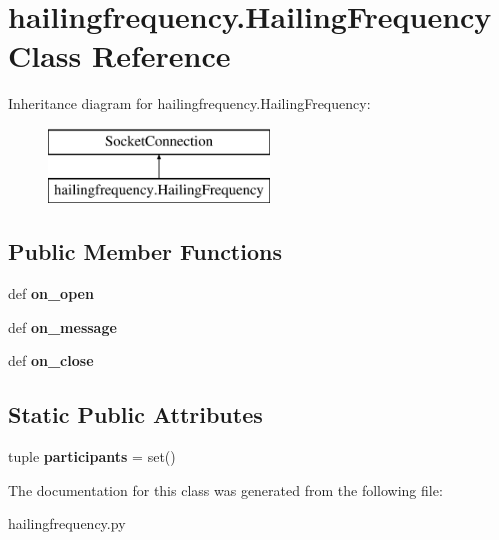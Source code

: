\hypertarget{classhailingfrequency_1_1_hailing_frequency}{\section{hailingfrequency.\-Hailing\-Frequency Class Reference}
\label{classhailingfrequency_1_1_hailing_frequency}
}
Inheritance diagram for hailingfrequency.\-Hailing\-Frequency\-:\begin{figure}[H]
\begin{center}
\leavevmode
\includegraphics[height=2.000000cm]{classhailingfrequency_1_1_hailing_frequency}
\end{center}
\end{figure}
\subsection*{Public Member Functions}
\begin{DoxyCompactItemize}
\item 
\hypertarget{classhailingfrequency_1_1_hailing_frequency_a43ef95e6ea485f5d6f3237cffcffc2e8}{def {\bfseries on\-\_\-open}}\label{classhailingfrequency_1_1_hailing_frequency_a43ef95e6ea485f5d6f3237cffcffc2e8}

\item 
\hypertarget{classhailingfrequency_1_1_hailing_frequency_a6cd98bd788ac92a75717ea4eebc7ece5}{def {\bfseries on\-\_\-message}}\label{classhailingfrequency_1_1_hailing_frequency_a6cd98bd788ac92a75717ea4eebc7ece5}

\item 
\hypertarget{classhailingfrequency_1_1_hailing_frequency_a2b4502d47401f769da2d025af35df25e}{def {\bfseries on\-\_\-close}}\label{classhailingfrequency_1_1_hailing_frequency_a2b4502d47401f769da2d025af35df25e}

\end{DoxyCompactItemize}
\subsection*{Static Public Attributes}
\begin{DoxyCompactItemize}
\item 
\hypertarget{classhailingfrequency_1_1_hailing_frequency_a0e09ad983a40863402e49ed9e69e463d}{tuple {\bfseries participants} = set()}\label{classhailingfrequency_1_1_hailing_frequency_a0e09ad983a40863402e49ed9e69e463d}

\end{DoxyCompactItemize}


The documentation for this class was generated from the following file\-:\begin{DoxyCompactItemize}
\item 
hailingfrequency.\-py\end{DoxyCompactItemize}
